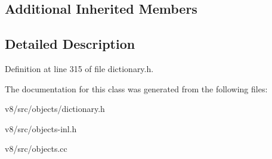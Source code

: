 \subsection*{Additional Inherited Members}


\subsection{Detailed Description}


Definition at line 315 of file dictionary.\+h.



The documentation for this class was generated from the following files\+:\begin{DoxyCompactItemize}
\item 
v8/src/objects/dictionary.\+h\item 
v8/src/objects-\/inl.\+h\item 
v8/src/objects.\+cc\end{DoxyCompactItemize}
